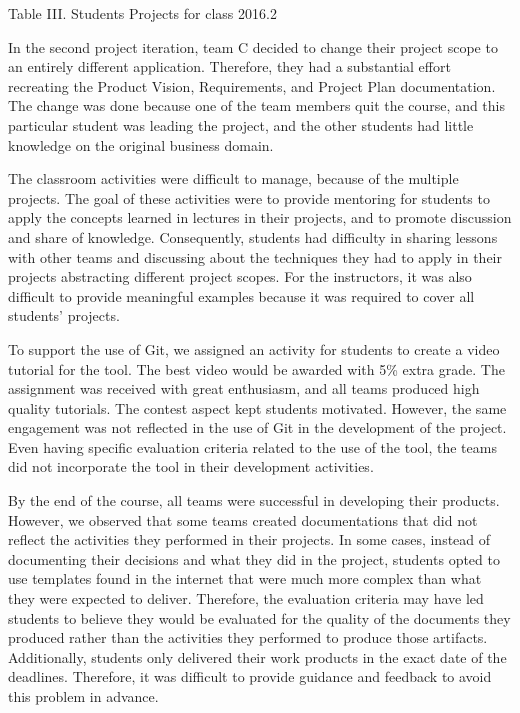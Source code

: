 Table III. Students Projects for class 2016.2

In the second project iteration, team C decided to change their project scope to an entirely different application. Therefore, they had a substantial effort recreating the Product Vision, Requirements, and Project Plan documentation. The change was done because one of the team members quit the course, and this particular student was leading the project, and the other students had little knowledge on the original business domain. 

The classroom activities were difficult to manage, because of the multiple projects. The goal of these activities were to provide mentoring for students to apply the concepts learned in lectures in their projects, and to promote discussion and share of knowledge. Consequently, students had difficulty in sharing lessons with other teams and discussing about the techniques they had to apply in their projects abstracting different project scopes. For the instructors, it was also difficult to provide meaningful examples because it was required to cover all students’ projects.

To support the use of Git, we assigned an activity for students to create a video tutorial for the tool. The best video would be awarded with 5\% extra grade. The assignment was received with great enthusiasm, and all teams produced high quality tutorials. The contest aspect kept students motivated. However, the same engagement was not reflected in the use of Git in the development of the project. Even having specific evaluation criteria related to the use of the tool, the teams did not incorporate the tool in their development activities.

By the end of the course, all teams were successful in developing their products. However, we observed that some teams created documentations that did not reflect the activities they performed in their projects. In some cases, instead of documenting their decisions and what they did in the project, students opted to use templates found in the internet that were much more complex than what they were expected to deliver. 
Therefore, the evaluation criteria may have led students to believe they would be evaluated for the quality of the documents they produced rather than the activities they performed to produce those artifacts. Additionally, students only delivered their work products in the exact date of the deadlines. Therefore, it was difficult to provide guidance and feedback to avoid this problem in advance.

